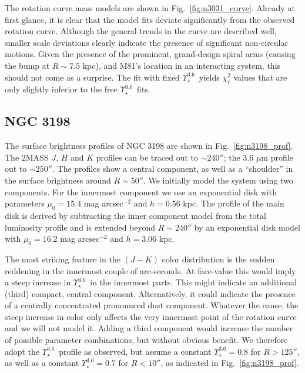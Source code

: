 \documentclass[usenatbib,usegraphicx,apjfonts,floatfix]{emulateapj}
\newcommand{\Ups}{\ensuremath{\Upsilon_{\star}^{3.6}}}
\begin{document}
The rotation curve mass models are shown in
Fig.~\ref{fig:n3031_curve}. Already at first glance, it is clear that
the model fits deviate significantly from the observed rotation curve.
Although the general trends in the curve are described well, smaller
scale deviations clearly indicate the presence of significant
non-circular motions. Given the presence of the prominent,
grand-design spiral arms (causing the bump at $R \sim 7.5$ kpc), and
M81's location in an interacting system, this should not come as a
surprise.  The fit with fixed \Ups\ yields $\chi^2_r$ values that are
only slightly inferior to the free \Ups\ fits.

\subsection{NGC 3198}

The surface brightness profiles of NGC 3198 are shown in
Fig.~\ref{fig:n3198_prof}. The 2MASS $J$, $H$ and $K$ profiles can be
traced out to $\sim 240''$; the 3.6 $\mu$m profile out to $\sim
250''$.  The profiles show a central component, as well as a
``shoulder'' in the surface brightness around $R\sim 50''$. We
initially model the system using two components.  For the innermost
component we use an exponential disk with parameters $\mu_0 = 15.4$
mag arcsec$^{-2}$ and $h=0.56$ kpc. The profile of the main disk is
derived by subtracting the inner component model from the total
luminosity profile and is extended beyond $R\sim 240''$ by an
exponential disk model with $\mu_0 = 16.2$ mag arcsec$^{-2}$ and
$h=3.06$ kpc.
 
The most striking feature in the $(J-K)$ color distribution is the
sudden reddening in the innermost couple of arc-seconds. At face-value
this would imply a steep increase in \Ups\ in the innermost parts.
This might indicate an additional (third) compact, central
component. Alternatively, it could indicate the presence of a
centrally concentrated pronounced dust component.  Whatever the cause,
the steep increase in color only affects the very innermost point of
the rotation curve and we will not model it. Adding a third component
would increase the number of possible parameter combinations, but
without obvious benefit.  We therefore adopt the \Ups\ profile as
observed, but assume a constant $\Ups = 0.8$ for $R>125''$, as well as
a constant $\Ups = 0.7$ for $R<10''$, as indicated in
Fig.~\ref{fig:n3198_prof}.
\end{document}
